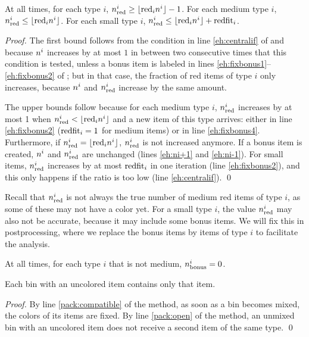 \begin{aproperty}
\label{prop:redok}
At all times, for each type $i$, $n_{\mathrm{red}}^i\ge\lfloor\mathrm{red}_in^i\rfloor-1$.
For each medium type $i$, $n_{\mathrm{red}}^i\le \lfloor\mathrm{red}_in^i\rfloor$.
For each small type $i$, $n_{\mathrm{red}}^i\le \lfloor\mathrm{red}_in^i\rfloor+\mathrm{redfit}_i$.
\end{aproperty}
\begin{proof}
The first bound follows from the condition in line \ref{eh:centralif} of {\EHarm} and because $n^i$ increases by at most $1$ in between two consecutive times that this condition is tested, unless a bonus item is labeled in lines \ref{eh:fixbonus1}--\ref{eh:fixbonus2} of {\EHarm}; but in that case, the fraction of red items of type $i$ only increases, because
$n^i$ and $n_{\mathrm{red}}^i$ increase by the same amount.

The upper bounds follow because for each medium type $i$, $n_{\mathrm{red}}^i$ increases by at most 1 when $n_{\mathrm{red}}^i<\lfloor\mathrm{red}_in^i\rfloor$ and a new item of this type arrives: either in line \ref{eh:fixbonus2} ($\mathrm{redfit}_i=1$ for medium items) or in
line \ref{eh:fixbonus4}. Furthermore, if $n_{\mathrm{red}}^i=\lfloor\mathrm{red}_in^i\rfloor$, $n_{\mathrm{red}}^i$ is not increased anymore.
If a bonus item is created, $n^i$ and $n_{\mathrm{red}}^i$ are unchanged (lines \ref{eh:ni+1} and \ref{eh:ni-1}).
For small items, $n_{\mathrm{red}}^i$ increases by at most $\mathrm{redfit}_i$ in one iteration (line \ref{eh:fixbonus2}), and this only happens if the ratio is too low (line \ref{eh:centralif}).
\qed\end{proof}

Recall that $n_{\mathrm{red}}^i$ is not always the true number of medium red items of type $i$, as some of these may not have a color yet.
For a small type $i$, the value $n_{\mathrm{red}}^i$ may also not be accurate, because it may include some bonus items. We will fix this in postprocessing, where we replace the bonus items by items of type $i$ to facilitate the analysis.

\begin{aproperty}
At all times, for each type $i$ that is not medium, $n_{\mathrm{bonus}}^i=0$.
\end{aproperty}

\begin{aproperty}
\label{prop:nocolor}
Each bin with an uncolored item contains only that item.
\end{aproperty}
\begin{proof}
By line \ref{pack:compatible} of the {\Pack} method, as soon as a bin becomes mixed, the colors of its items are fixed. 
By line \ref{pack:open} of the {\Pack} method, an unmixed bin with an uncolored item does not receive a second item of the same type.
\qed
\end{proof}

